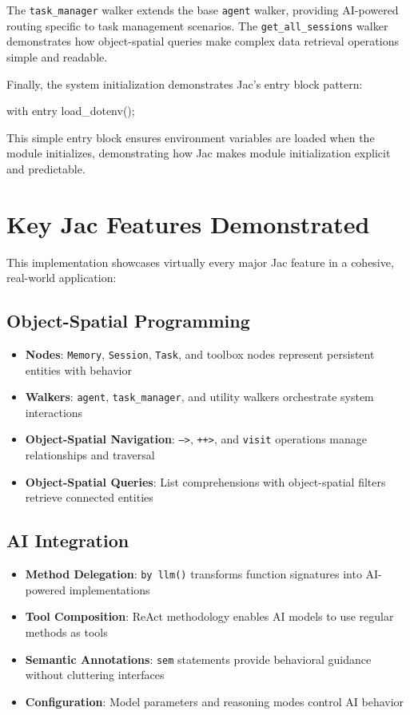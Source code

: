 The \texttt{task\_manager} walker extends the base \texttt{agent} walker, providing AI-powered routing specific to task management scenarios. The \texttt{get\_all\_sessions} walker demonstrates how object-spatial queries make complex data retrieval operations simple and readable.

Finally, the system initialization demonstrates Jac's entry block pattern:

\begin{jacblock}
with entry {
    load_dotenv();
}
\end{jacblock}

This simple entry block ensures environment variables are loaded when the module initializes, demonstrating how Jac makes module initialization explicit and predictable.

\section{Key Jac Features Demonstrated}

This implementation showcases virtually every major Jac feature in a cohesive, real-world application:

\subsection{Object-Spatial Programming}
\begin{itemize}
    \item \textbf{Nodes}: \texttt{Memory}, \texttt{Session}, \texttt{Task}, and toolbox nodes represent persistent entities with behavior
    \item \textbf{Walkers}: \texttt{agent}, \texttt{task\_manager}, and utility walkers orchestrate system interactions
    \item \textbf{Object-Spatial Navigation}: \texttt{-->}, \texttt{++>}, and \texttt{visit} operations manage relationships and traversal
    \item \textbf{Object-Spatial Queries}: List comprehensions with object-spatial filters retrieve connected entities
\end{itemize}

\subsection{AI Integration}
\begin{itemize}
    \item \textbf{Method Delegation}: \texttt{by llm()} transforms function signatures into AI-powered implementations
    \item \textbf{Tool Composition}: ReAct methodology enables AI models to use regular methods as tools
    \item \textbf{Semantic Annotations}: \texttt{sem} statements provide behavioral guidance without cluttering interfaces
    \item \textbf{Configuration}: Model parameters and reasoning modes control AI behavior
\end{itemize}

